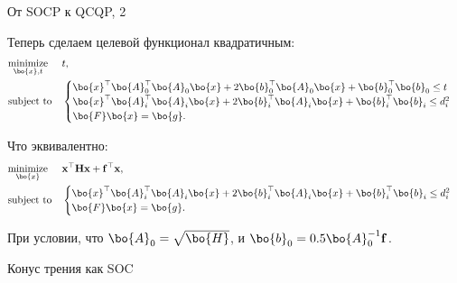 \documentclass{beamer}
\begin{document}
\begin{frame}{От SOCP к QCQP, 2}
	\begin{flushleft}
		
		
		Теперь сделаем целевой функционал квадратичным:
		\begin{equation}
			\begin{aligned}
				& \underset{\bo{x}, t}{\text{minimize}}
				& & t, \\
				& \text{subject to}
				& & \begin{cases}
					\bo{x}^\top \bo{A}_0^\top \bo{A}_0 \bo{x} + 
					2 \bo{b}_0^\top \bo{A}_0\bo{x} + 
					\bo{b}_0^\top \bo{b}_0  \leq t\\
					\bo{x}^\top \bo{A}_i^\top \bo{A}_i \bo{x} + 
					2 \bo{b}_i^\top \bo{A}_i\bo{x} + 
					\bo{b}_i^\top \bo{b}_i  \leq d_i^2\\
					\bo{F}\bo{x} = \bo{g}.
				\end{cases}
			\end{aligned}
		\end{equation}
		
		Что эквивалентно:
		\begin{equation}
			\begin{aligned}
				& \underset{\bo{x}}{\text{minimize}}
				& & \mathbf{x}^\top \mathbf{H} \mathbf{x} + \mathbf{f}^\top\mathbf{x}, \\
				& \text{subject to}
				& & \begin{cases}
					\bo{x}^\top \bo{A}_i^\top \bo{A}_i \bo{x} + 
					2 \bo{b}_i^\top \bo{A}_i\bo{x} + 
					\bo{b}_i^\top \bo{b}_i  \leq d_i^2\\
					\bo{F}\bo{x} = \bo{g}.
				\end{cases}
			\end{aligned}
		\end{equation}
		
		При условии, что $\bo{A}_0 = \sqrt{\bo{H}}$, и $\bo{b}_0 = 0.5 \bo{A}_0^{-1} \mathbf{f}$.
		
	\end{flushleft}
\end{frame}

\begin{frame}
	\centerline{\huge Конус трения как SOC}
\end{frame}
\end{document}
